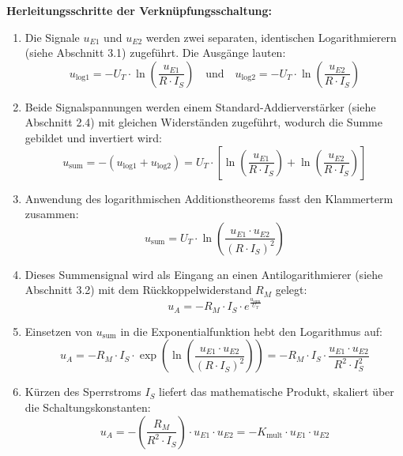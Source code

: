 \documentclass[11pt,a4paper]{article}
\begin{document}
\textbf{Herleitungsschritte der Verknüpfungsschaltung:}
\begin{enumerate}
    \item Die Signale $u_{E1}$ und $u_{E2}$ werden zwei separaten, identischen Logarithmierern (siehe Abschnitt 3.1) zugeführt. Die Ausgänge lauten:
    \begin{equation}
    u_{\text{log}1} = -U_T \cdot \ln\left(\frac{u_{E1}}{R \cdot I_S}\right) \quad \text{und} \quad u_{\text{log}2} = -U_T \cdot \ln\left(\frac{u_{E2}}{R \cdot I_S}\right)
    \end{equation}
    \item Beide Signalspannungen werden einem Standard-Addierverstärker (siehe Abschnitt 2.4) mit gleichen Widerständen zugeführt, wodurch die Summe gebildet und invertiert wird:
    \begin{equation}
    u_{\text{sum}} = -(u_{\text{log}1} + u_{\text{log}2}) = U_T \cdot \left[ \ln\left(\frac{u_{E1}}{R \cdot I_S}\right) + \ln\left(\frac{u_{E2}}{R \cdot I_S}\right) \right]
    \end{equation}
    \item Anwendung des logarithmischen Additionstheorems fasst den Klammerterm zusammen:
    \begin{equation}
    u_{\text{sum}} = U_T \cdot \ln\left( \frac{u_{E1} \cdot u_{E2}}{(R \cdot I_S)^2} \right)
    \end{equation}
    \item Dieses Summensignal wird als Eingang an einen Antilogarithmierer (siehe Abschnitt 3.2) mit dem Rückkoppelwiderstand $R_M$ gelegt:
    \begin{equation}
    u_A = -R_M \cdot I_S \cdot e^{\frac{u_{\text{sum}}}{U_T}}
    \end{equation}
    \item Einsetzen von $u_{\text{sum}}$ in die Exponentialfunktion hebt den Logarithmus auf:
    \begin{equation}
    u_A = -R_M \cdot I_S \cdot \exp\left( \ln\left( \frac{u_{E1} \cdot u_{E2}}{(R \cdot I_S)^2} \right) \right) = -R_M \cdot I_S \cdot \frac{u_{E1} \cdot u_{E2}}{R^2 \cdot I_S^2}
    \end{equation}
    \item Kürzen des Sperrstroms $I_S$ liefert das mathematische Produkt, skaliert über die Schaltungskonstanten:
    \begin{equation}
    u_A = -\left(\frac{R_M}{R^2 \cdot I_S}\right) \cdot u_{E1} \cdot u_{E2} = -K_{\text{mult}} \cdot u_{E1} \cdot u_{E2}
    \end{equation}
\end{enumerate}
\end{document}
